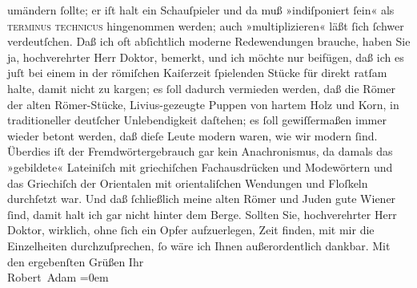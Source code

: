 \begin{ledgroupsized}[t]{13cm}
                    umändern ſollte; er iſt halt ein Schauſpieler und da muß »indiſponiert ſein« als
                        \textsc{terminus technicus} hingenommen werden; auch
                    »multiplizieren« läßt ſich ſchwer verdeutſchen. Daß ich oft abſichtlich moderne
                    Redewendungen brauche, haben Sie ja, hochverehrter Herr Doktor, be{\pb}merkt, und ich möchte nur beifügen,
                    daß ich es juſt bei einem in der römiſchen
                    Kaiſerzeit ſpielenden Stücke für direkt ratſam halte, damit nicht zu kargen; es
                    ſoll dadurch vermieden werden, daß die Römer
                    der alten Römer-Stücke, Livius-gezeugte Puppen von hartem Holz und Korn, in
                    traditioneller deutſcher Unlebendigkeit daſtehen; es ſoll gewiſſermaßen immer
                    wieder betont werden, daß dieſe Leute modern waren, wie wir modern ſind.
                    Überdies iſt der Fremdwörtergebrauch gar kein Anachronismus, da damals das
                    »gebildete« Lateiniſch mit griechiſchen
                    Fachausdrücken und Modewörtern und das Griechiſch der Orientalen mit orientaliſchen Wendungen und Floſkeln
                    durchſetzt war. Und daß ſchließlich meine alten Römer und Juden gute Wiener ſind,
                    damit halt ich gar nicht hinter dem Berge.\pend
           \pstart
           Sollten Sie, hochverehrter Herr Doktor, wirklich, ohne ſich ein Opfer
                    aufzuerlegen, Zeit finden, mit mir die Einzelheiten durchzuſprechen, ſo wäre ich
                    Ihnen außerordentlich dankbar.\pend
           \pstart
           Mit den ergebenſten Grüßen\pend
           \pstart
           Ihr{\\[\baselineskip]}\spacefill\mbox{Robert Adam}\pend
           \leftskip=0em{}
         
         \endnumbering{}\end{ledgroupsized}  \newcommand{\dateiname}{L02279}\newcommand{\titel}{Robert Adam an Arthur Schnitzler, 5. 11. 1917}\newcommand{\editorInnen}{Martin Anton Müller und Gerd-Hermann Susen}
      